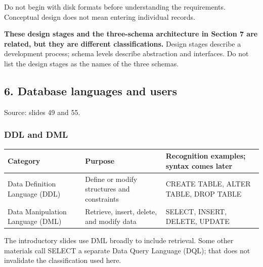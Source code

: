 Do not begin with disk formats before understanding the requirements. Conceptual design does not mean entering individual records.

\textbf{These design stages and the three-schema architecture in Section 7 are related, but they are different classifications.} Design stages describe a development process; schema levels describe abstraction and interfaces. Do not list the design stages as the names of the three schemas.

\subsection{6. Database languages and users}\label{01_database_fundamentals_en-database-languages-and-users}

Source: slides 49 and 55.

\subsubsection{DDL and DML}\label{01_database_fundamentals_en-ddl-and-dml}

\begin{longtable}[]{@{}
  >{\raggedright\arraybackslash}p{}
  >{\raggedright\arraybackslash}p{}
  >{\raggedright\arraybackslash}p{}@{}}
\toprule\noalign{}
\begin{minipage}[b]{\linewidth}\raggedright
Category
\end{minipage} & \begin{minipage}[b]{\linewidth}\raggedright
Purpose
\end{minipage} & \begin{minipage}[b]{\linewidth}\raggedright
Recognition examples; syntax comes later
\end{minipage} \\
\midrule\noalign{}
\endhead
\bottomrule\noalign{}
\endlastfoot
Data Definition Language (DDL) & Define or modify structures and constraints & CREATE TABLE, ALTER TABLE, DROP TABLE \\
Data Manipulation Language (DML) & Retrieve, insert, delete, and modify data & SELECT, INSERT, DELETE, UPDATE \\
\end{longtable}

The introductory slides use DML broadly to include retrieval. Some other materials call SELECT a separate Data Query Language (DQL); that does not invalidate the classification used here.

